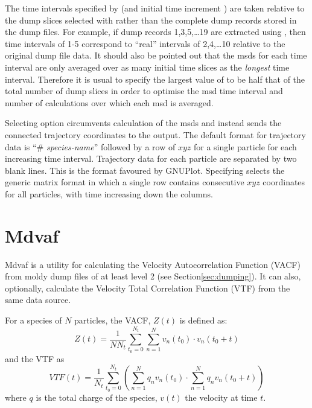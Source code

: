 \documentclass[a4paper,twoside]{report}
\begin{document}
The time intervals specified by  (and initial time increment
) are taken relative to the dump slices selected with 
rather than the complete dump records stored in the dump files. For
example, if dump records 1,3,5,\ldots{}19 are extracted using , then
time intervals of  1-5 correspond to ``real'' intervals of
2,4,\ldots{}10 relative to the original dump file data. It should also be
pointed out that the msds for each time interval are only averaged
over as many initial time slices as the \emph{longest} time interval.
Therefore it is usual to specify the largest value of  to be
half that of the total number of dump slices in order to optimise the
msd time interval and number of calculations over which each msd is
averaged.

Selecting option  circumvents calculation of the msds and
instead sends the connected trajectory coordinates to the output. The
default format for trajectory data is ``\# \textit{species-name}'' followed by a
row of $x y z$ for a single particle for each increasing time interval.
Trajectory data for each particle are separated by two blank lines.
This is the format favoured by GNUPlot. Specifying   selects
the generic matrix format in which a single row contains consecutive $x
y z$ coordinates for all particles, with time increasing down the
columns.

\section{Mdvaf}%
Mdvaf is a utility for calculating the Velocity Autocorrelation 
Function (VACF) from moldy dump files of at least level 2 (see 
Section\ref{sec:dumping}). It can also, optionally, calculate the Velocity 
Total Correlation Function (VTF) from the same data source.

For a species of $N$ particles, the VACF, $Z(t)$ is defined as:
\begin{equation}
  Z(t) = \frac{1}{N N_t} \sum_{t_0=0}^{N_t} \sum_{n=1}^N v_n(t_0) \cdot v_n(t_0 + t)
\end{equation}
and the VTF as
\begin{equation}
  VTF(t)= \frac{1}{N_t} \sum_{t_0=0}^{N_t} \left ( \sum_{n=1}^N q_n v_n(t_0) 
  \cdot  \sum_{n=1}^N  q_n v_n(t_0 + t) \right )
\end{equation}
where $q$ is the total charge of the species, $v(t)$ the
velocity at time $t$.
\end{document}

